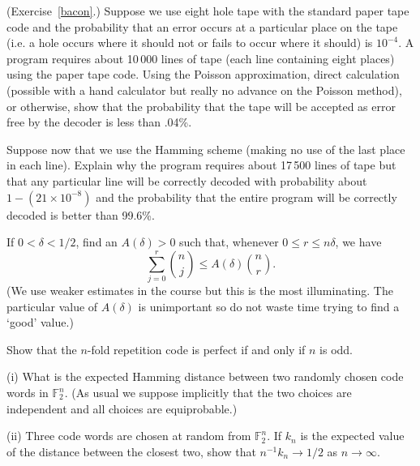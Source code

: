 \begin{question}\label{C2.4}
(Exercise~\ref{bacon}.)
Suppose we use eight hole tape with
the standard paper tape code
and the probability that an error occurs at a particular
place on the tape (i.e. a hole occurs where it should
not or fails to occur where it should) is $10^{-4}$.
A program requires about 10\,000 lines of tape
(each line containing eight places)
using the paper tape code. Using
the Poisson approximation, direct calculation
(possible with a hand calculator but really no
advance on the Poisson method), or otherwise,
show that the probability that the tape
will be accepted as error free by the decoder
is less than .04\%.

Suppose now that we use the Hamming scheme
(making no use of the last place in each line).
Explain why the program requires about
17\,500 lines of tape but that any
particular line will be correctly decoded
with probability about $1-(21\times 10^{-8})$
and the probability that the entire program
will be correctly decoded is better than
99.6\%.
\end{question}
\begin{question}\label{C2.5} 
If $0<\delta<1/2$,
find an $A(\delta)>0$ such that, whenever
$0\leq r\leq n\delta$, we have
\[\sum_{j=0}^{r}\binom{n}{j}\leq A(\delta)\binom{n}{r}.\]
(We use weaker estimates in the course but this is
the most illuminating. The particular value of $A(\delta)$
is unimportant so do not waste time trying to find
a `good' value.)
\end{question}
\begin{question}\label{C2.6}
Show that the $n$-fold repetition code
is perfect if and only if $n$ is odd.
\end{question}
\begin{question}\label{C2.7} 
(i) What is the expected Hamming distance
between two randomly chosen code words in ${\mathbb F}_{2}^{n}$.
(As usual we suppose implicitly that the two choices are independent
and all choices are equiprobable.)

(ii) Three code words are chosen at random 
from ${\mathbb F}_{2}^{n}$. If $k_{n}$ is
the expected value of the distance between the
closest two,
show that $n^{-1}k_{n}\rightarrow 1/2$ as
$n\rightarrow\infty$. 

\end{question}
